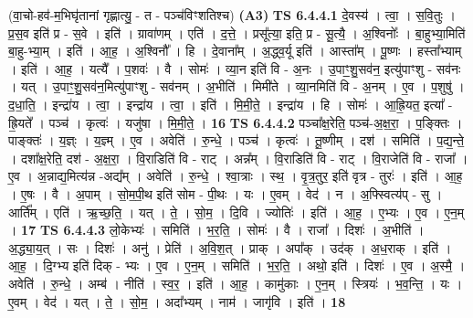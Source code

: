 \documentclass[17pt]{extarticle}
\begin{document}
                  \newline
                      (वा॒चो-हव॑-म॒भिघृ॑तानां गृह्णात्यु॒ - त - पञ्च॑विꣳशतिश्च)  \textbf{(A3)} \newline \newline
                                \textbf{ TS 6.4.4.1} \newline
                  दे॒वस्य॑ । त्वा॒ । स॒वि॒तुः । प्र॒स॒व इति॑ प्र - स॒वे । इति॑ । ग्रावा॑णम् । एति॑ । द॒त्ते॒ । प्रसू᳚त्या॒ इति॒ प्र - सू॒त्यै॒ । अ॒श्विनोः᳚ । बा॒हुभ्या॒मिति॑ बा॒हु-भ्या॒म् । इति॑ । आ॒ह॒ । अ॒श्विनौ᳚ । हि । दे॒वाना᳚म् । अ॒द्ध्व॒र्यू इति॑ । आस्ता᳚म् । पू॒ष्णः । हस्ता᳚भ्याम् । इति॑ । आ॒ह॒ । यत्यै᳚ । प॒शवः॑ । वै । सोमः॑ । व्या॒न इति॑ वि - अ॒नः । उ॒पाꣳ॒॒शु॒सव॑न॒ इत्यु॑पाꣳशु - सव॑नः । यत् । उ॒पाꣳ॒॒शु॒सव॑न॒मित्यु॑पाꣳशु - सव॑नम् । अ॒भीति॑ । मिमी॑ते । व्या॒नमिति॑ वि - अ॒नम् । ए॒व । प॒शुषु॑ । द॒धा॒ति॒ । इन्द्रा॑य । त्वा॒ । इन्द्रा॑य । त्वा॒ । इति॑ । मि॒मी॒ते॒ । इन्द्रा॑य । हि । सोमः॑ । आ॒ह्रि॒यत॒ इत्या᳚ - ह्रि॒यते᳚ । पञ्च॑ । कृत्वः॑ । यजु॑षा । मि॒मी॒ते॒ । \textbf{  16} \newline
                  \newline
                                \textbf{ TS 6.4.4.2} \newline
                  पञ्चा᳚क्ष॒रेति॒ पञ्च॑-अ॒क्ष॒रा॒ । प॒ङ्क्तिः । पाङ्क्तः॑ । य॒ज्ञ्ः । य॒ज्ञ्म् । ए॒व । अवेति॑ । रु॒न्धे॒ । पञ्च॑ । कृत्वः॑ । तू॒ष्णीम् । दश॑ । समिति॑ । प॒द्य॒न्ते॒ । दशा᳚क्ष॒रेति॒ दश॑ - अ॒क्ष॒रा॒ । वि॒राडिति॑ वि - राट् । अन्न᳚म् । वि॒राडिति॑ वि - राट् । वि॒राजेति॑ वि - राजा᳚ । ए॒व । अ॒न्नाद्य॒मित्य॑न्न -अद्य᳚म् । अवेति॑ । रु॒न्धे॒ । श्वा॒त्राः । स्थ॒ । वृ॒त्र॒तुर॒ इति॑ वृत्र - तुरः॑ । इति॑ । आ॒ह॒ । ए॒षः । वै । अ॒पाम् । सो॒म॒पी॒थ इति॑ सोम - पी॒थः । यः । ए॒वम् । वेद॑ । न । अ॒फ्स्वित्य॑प् - सु । आर्ति᳚म् । एति॑ । ऋ॒च्छ॒ति॒ । यत् । ते॒ । सो॒म॒ । दि॒वि । ज्योतिः॑ । इति॑ । आ॒ह॒ । ए॒भ्यः । ए॒व । ए॒न॒म् । \textbf{  17} \newline
                  \newline
                                \textbf{ TS 6.4.4.3} \newline
                  लो॒केभ्यः॑ । समिति॑ । भ॒र॒ति॒ । सोमः॑ । वै । राजा᳚ । दिशः॑ । अ॒भीति॑ । अ॒द्ध्या॒य॒त् । सः । दिशः॑ । अनु॑ । प्रेति॑ । अ॒वि॒श॒त् । प्राक् । अपा᳚क् । उद॑क् । अ॒ध॒राक् । इति॑ । आ॒ह॒ । दि॒ग्भ्य इति॑ दिक् - भ्यः । ए॒व । ए॒न॒म् । समिति॑ । भ॒र॒ति॒ । अथो॒ इति॑ । दिशः॑ । ए॒व । अ॒स्मै॒ । अवेति॑ । रु॒न्धे॒ । अम्ब॑ । नीति॑ । स्व॒र॒ । इति॑ । आ॒ह॒ । कामु॑काः । ए॒न॒म् । स्त्रियः॑ । भ॒व॒न्ति॒ । यः । ए॒वम् । वेद॑ । यत् । ते॒ । सो॒म॒ । अदा᳚भ्यम् । नाम॑ । जागृ॑वि । इति॑ । \textbf{  18} \newline
\end{document}
